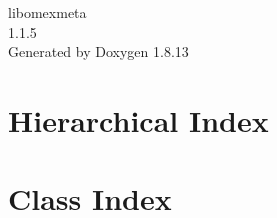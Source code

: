 \documentclass[twoside]{book}
\newcommand{\+}{\discretionary{\mbox{\scriptsize$\hookleftarrow$}}{}{}}
\newcommand{\clearemptydoublepage}{%
  \newpage{\pagestyle{empty}\cleardoublepage}%
}
\begin{document}
\hypersetup{pageanchor=false,
             bookmarksnumbered=true,
             pdfencoding=unicode
            }
\begin{titlepage}
\vspace*{7cm}
\begin{center}%
{\Large libomexmeta \\[1ex]\large 1.\+1.\+5 }\\
\vspace*{1cm}
{\large Generated by Doxygen 1.8.13}\\
\end{center}
\end{titlepage}
\clearemptydoublepage
{}
\tableofcontents
\clearemptydoublepage
{}
\hypersetup{pageanchor=true}

\chapter{Hierarchical Index}

\chapter{Class Index}

\end{document}

